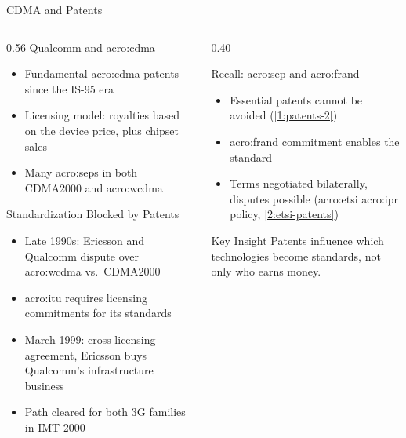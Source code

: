 \begin{frame}{CDMA and Patents}
  \begin{columns}[T,onlytextwidth]
    \begin{column}{0.56\textwidth}
      Qualcomm and \gls{acro:cdma}
      \begin{itemize}
        \item Fundamental \gls{acro:cdma} patents since the IS-95 era
        \item Licensing model: royalties based on the device price, plus chipset sales
        \item Many \glspl{acro:sep} in both CDMA2000 and \gls{acro:wcdma}
      \end{itemize}
      \vspace{0.4em}
      Standardization Blocked by Patents
      \begin{itemize}
        \item Late 1990s: Ericsson and Qualcomm dispute over \gls{acro:wcdma} vs.\ CDMA2000
        \item \Gls{acro:itu} requires licensing commitments for its standards
        \item March 1999: cross-licensing agreement, Ericsson buys Qualcomm's infrastructure business~\cite{qualcomm-ericsson-1999}
        \item Path cleared for both 3G families in IMT-2000
      \end{itemize}
    \end{column}
    \begin{column}{0.40\textwidth}
      \begin{block}{Recall: \gls{acro:sep} and \gls{acro:frand}}
        \begin{itemize}
          \item Essential patents cannot be avoided (\cref{1:patents-2})
          \item \Gls{acro:frand} commitment enables the standard
          \item Terms negotiated bilaterally, disputes possible (\gls{acro:etsi} \gls{acro:ipr} policy, \cref{2:etsi-patents})
        \end{itemize}
      \end{block}
      \begin{alertblock}{Key Insight}
        Patents influence which technologies become standards, not only who earns money.
      \end{alertblock}
    \end{column}
  \end{columns}
\end{frame}

